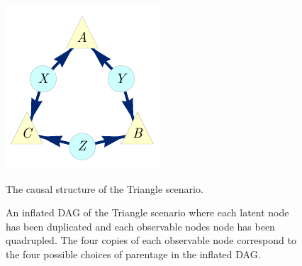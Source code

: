 \begin{figure}[h]
\centering
\begin{minipage}[t]{0.23\linewidth}
\centering
\includegraphics[scale=1]{TriDagRawALT.pdf}
\caption{The causal structure of the Triangle scenario.}\label{fig:TriMainDAG}
\end{minipage}
\hfill
\begin{minipage}[t]{0.43\linewidth}
\centering
{}
\caption{An inflated DAG of the Triangle scenario where each latent node has been duplicated and each observable nodes node has been quadrupled. The four copies of each observable node correspond to the four possible choices of parentage in the inflated DAG.}\label{fig:TriFullDouble}
\end{minipage}
\hfill
\begin{minipage}[t]{0.3\linewidth}

\end{minipage}
\end{figure}
